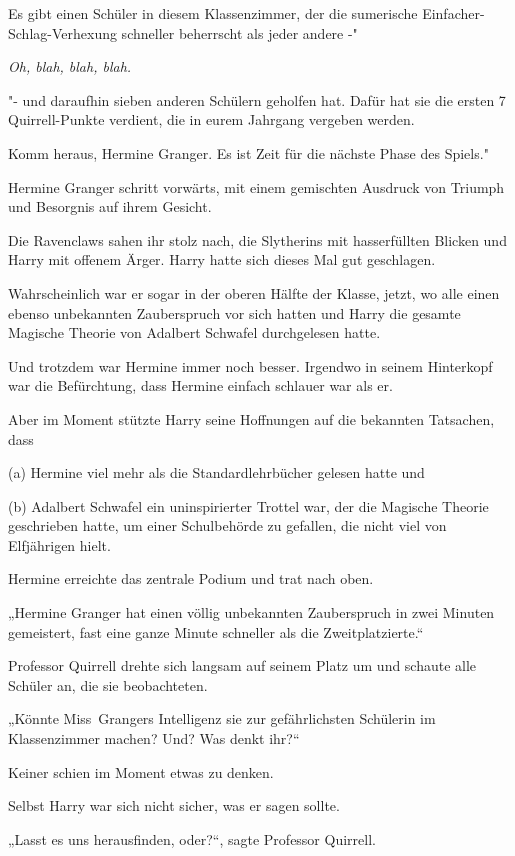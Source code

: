 {Es gibt einen Schüler in diesem Klassenzimmer, der die sumerische Einfacher-Schlag-Verhexung schneller beherrscht als jeder andere -"

\emph{Oh, blah, blah, blah.}

"- und daraufhin sieben anderen Schülern geholfen hat. Dafür hat sie die ersten 7 Quirrell-Punkte verdient, die in eurem Jahrgang vergeben werden.

Komm heraus, Hermine Granger. Es ist Zeit für die nächste Phase des Spiels."

Hermine Granger schritt vorwärts, mit einem gemischten Ausdruck von Triumph und Besorgnis auf ihrem Gesicht.

Die Ravenclaws sahen ihr stolz nach, die Slytherins mit hasserfüllten Blicken und Harry mit offenem Ärger. Harry hatte sich dieses Mal gut geschlagen.

Wahrscheinlich war er sogar in der oberen Hälfte der Klasse, jetzt, wo alle einen ebenso unbekannten Zauberspruch vor sich hatten und Harry die gesamte Magische Theorie von Adalbert Schwafel durchgelesen hatte.

Und trotzdem war Hermine immer noch besser. Irgendwo in seinem Hinterkopf war die Befürchtung, dass Hermine einfach schlauer war als er.

Aber im Moment stützte Harry seine Hoffnungen auf die bekannten Tatsachen, dass

(a) Hermine viel mehr als die Standardlehrbücher gelesen hatte und

(b) Adalbert Schwafel ein uninspirierter Trottel war, der die Magische Theorie geschrieben hatte, um einer Schulbehörde zu gefallen, die nicht viel von Elfjährigen hielt.

Hermine erreichte das zentrale Podium und trat nach oben.

„Hermine Granger hat einen völlig unbekannten Zauberspruch in zwei Minuten gemeistert, fast eine ganze Minute schneller als die Zweitplatzierte.“

Professor Quirrell drehte sich langsam auf seinem Platz um und schaute alle Schüler an, die sie beobachteten.

„Könnte Miss~Grangers Intelligenz sie zur gefährlichsten Schülerin im Klassenzimmer machen? Und? Was denkt ihr?“

Keiner schien im Moment etwas zu denken.

Selbst Harry war sich nicht sicher, was er sagen sollte.

„Lasst es uns herausfinden, oder?“, sagte Professor Quirrell.

}

